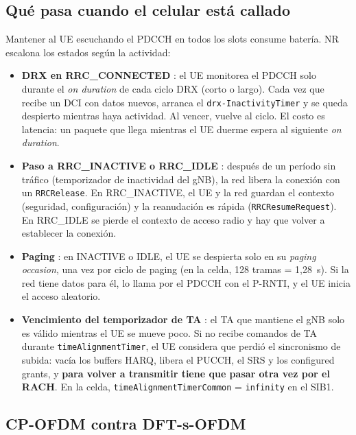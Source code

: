 \subsection{Qué pasa cuando el celular está callado}\label{sec:callado}
Mantener al UE escuchando el PDCCH en todos los slots consume batería. NR escalona los estados según la actividad:
\begin{itemize}
  \item \textbf{DRX en RRC\_CONNECTED} \cite[§5.7]{ts38321}: el UE monitorea el PDCCH solo durante el \emph{on duration} de cada ciclo DRX (corto o largo). Cada vez que recibe un DCI con datos nuevos, arranca el \texttt{drx-InactivityTimer} y se queda despierto mientras haya actividad. Al vencer, vuelve al ciclo. El costo es latencia: un paquete que llega mientras el UE duerme espera al siguiente \emph{on duration}.
  \item \textbf{Paso a RRC\_INACTIVE o RRC\_IDLE} \cite[§4.2.1]{ts38331}: después de un período sin tráfico (temporizador de inactividad del gNB), la red libera la conexión con un \texttt{RRCRelease}. En RRC\_INACTIVE, el UE y la red guardan el contexto (seguridad, configuración) y la reanudación es rápida (\texttt{RRCResumeRequest}). En RRC\_IDLE se pierde el contexto de acceso radio y hay que volver a establecer la conexión.
  \item \textbf{Paging} \cite{ts38304}: en INACTIVE o IDLE, el UE se despierta solo en su \emph{paging occasion}, una vez por ciclo de paging (en la celda, 128 tramas = 1,28~s). Si la red tiene datos para él, lo llama por el PDCCH con el P-RNTI, y el UE inicia el acceso aleatorio.
  \item \textbf{Vencimiento del temporizador de TA} \cite[§5.2]{ts38321}: el TA que mantiene el gNB solo es válido mientras el UE se mueve poco. Si no recibe comandos de TA durante \texttt{timeAlignmentTimer}, el UE considera que perdió el sincronismo de subida: vacía los buffers HARQ, libera el PUCCH, el SRS y los configured grants, y \textbf{para volver a transmitir tiene que pasar otra vez por el RACH}. En la celda, \texttt{timeAlignmentTimerCommon} = \texttt{infinity} en el SIB1.
\end{itemize}

\subsection{CP-OFDM contra DFT-s-OFDM}\label{sec:dfts}
